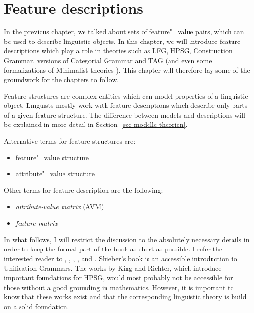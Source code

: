 




\chapter{Feature descriptions}
\label{chap-feature-descriptions}

In the previous chapter, we talked about sets of feature"=value pairs, which can be used to describe linguistic objects. In this chapter, we will introduce
feature descriptions which play a role in theories such as LFG, HPSG, Construction Grammar, versions of Categorial Grammar and TAG (and even some
formalizations of Minimalist theories \citep{Veenstra98a}). This chapter will therefore lay some of the groundwork for the chapters to follow.


Feature structures are complex entities which can model properties of a linguistic object. 
Linguists mostly work with feature descriptions which describe only parts of a given feature
structure. The difference between models and descriptions will be explained
in more detail in Section~\ref{sec-modelle-theorien}.

Alternative terms for feature structures are:
\begin{itemize}
\item feature"=value structure
\item attribute"=value structure
\end{itemize}
Other terms for feature description are the following:
\begin{itemize}
\item \emph{attribute-value matrix} (AVM)
\item \emph{feature matrix}
\end{itemize}
In what follows, I will restrict the discussion to the absolutely necessary details in order to keep the formal part of the book as short as possible. I refer
the interested reader to \citet{Shieber86a}, \citet[Chapter~2]{ps}, \citet{Johnson88}, \citet{Carpenter92a},
\citet{King94a} and \citet{Richter2004a-u}. Shieber's book is an accessible introduction to Unification Grammars. The works by King and Richter, which introduce important
foundations for HPSG, would most probably not be accessible for those without a good grounding in mathematics. 
However, it is important to know that these works exist and that the corresponding linguistic theory is build on a solid foundation.


